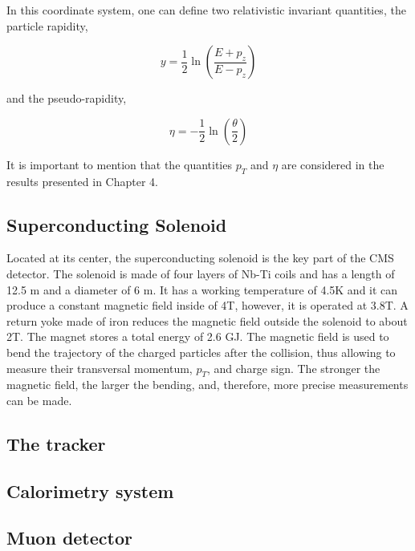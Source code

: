 In this coordinate system, one can define two relativistic invariant quantities, the particle rapidity,

\begin{equation}
y = \frac{1}{2}\ln\left(\frac{E+p_z}{E-p_z}\right)
\end{equation}

and the pseudo-rapidity,

\begin{equation}
\eta = -\frac{1}{2}\ln\left(\frac{\theta}{2}\right)
\end{equation}

It is important to mention that the quantities $p_T$ and $\eta$ are considered in the results presented in Chapter 4.

\subsection{Superconducting Solenoid}
Located at its center, the superconducting solenoid is the key part of the CMS detector. The solenoid is made of four layers of Nb-Ti coils and has a length of 12.5 m and a diameter of 6 m. It has a working temperature of 4.5K and it can produce a constant magnetic field inside of 4T, however, it is operated at 3.8T. A return yoke made of iron reduces the magnetic field outside the solenoid to about 2T. The magnet stores a total energy of 2.6 GJ. The magnetic field is used to bend the trajectory of the charged particles after the collision, thus allowing to measure their transversal momentum, $p_T$, and charge sign. The stronger the magnetic field, the larger the bending, and, therefore, more precise measurements can be made.
\subsection{The tracker}
\subsection{Calorimetry system}
\subsection{Muon detector}